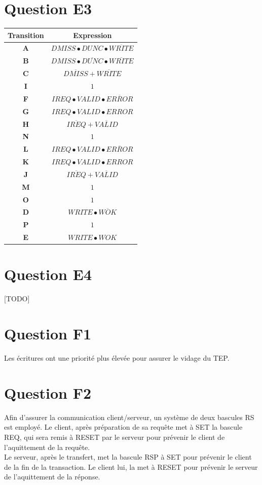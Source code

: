 \documentclass[10pt]{article}
\begin{document}
\section{Question E3}
\begin{center}
  \begin{tabular}{|c|c|}
    \hline
    {\bf Transition} & {\bf Expression} \\ \hline
    {\bf A} & ${DMISS}\bullet{DUNC}\bullet\overline{WRITE}$ \\ \hline
    {\bf B} & ${DMISS}\bullet\overline{DUNC}\bullet\overline{WRITE}$ \\ \hline
    {\bf C} & $\overline{DMISS}+\overline{WRITE}$ \\ \hline
    {\bf I} & $1$ \\ \hline
    {\bf F} & ${IREQ}\bullet{VALID}\bullet\overline{ERROR}$ \\ \hline
    {\bf G} & ${IREQ}\bullet{VALID}\bullet{ERROR}$ \\ \hline
    {\bf H} & $\overline{IREQ}+\overline{VALID}$ \\ \hline
    {\bf N} & $1$ \\ \hline
    {\bf L} & ${IREQ}\bullet{VALID}\bullet\overline{ERROR}$ \\ \hline
    {\bf K} & ${IREQ}\bullet{VALID}\bullet{ERROR}$ \\ \hline
    {\bf J} & $\overline{IREQ}+\overline{VALID}$ \\ \hline
    {\bf M} & $1$ \\ \hline
    {\bf O} & $1$ \\ \hline
    {\bf D} & ${WRITE}\bullet\overline{WOK}$ \\ \hline
    {\bf P} & $1$ \\ \hline
    {\bf E} & ${WRITE}\bullet{WOK}$ \\ \hline
  \end{tabular}
\end{center}

\section{Question E4}
[TODO]

\section{Question F1}
Les écritures ont une priorité plus élevée pour assurer le vidage du TEP.

\section{Question F2}
Afin d'assurer la communication client/serveur, un système de deux bascules RS
est employé. Le client, après préparation de sa requête met à SET la bascule
REQ, qui sera remis à RESET par le serveur pour prévenir le client de
l'aquittement de la requête.\\
Le serveur, après le transfert, met la bascule RSP à SET pour prévenir le client
de la fin de la transaction. Le client lui, la met à RESET pour prévenir le
serveur de l'aquittement de la réponse.
\end{document}
